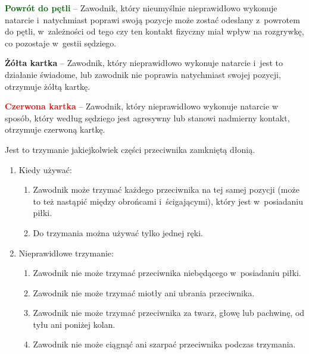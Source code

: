 \documentclass[12pt,a4paper]{article}
\renewcommand{\paragraph}[1]{
  \oldparagraph{#1}%
  \leftskip2.8cm
}
\newcommand\redcard[1]{\bgroup\textcolor{red}{\textbf{#1}}}
\newcommand\yellowcard[1]{\bgroup\textcolor{darkyellow}{\textbf{#1}}}
\newcommand\other[1]{\bgroup\textcolor{darkgreen}{\textbf{#1}}}
\begin{document}
\other{Powrót do pętli} -- Zawodnik, który nieumyślnie nieprawidłowo
wykonuje natarcie i~natychmiast poprawi swoją pozycje może zostać
odesłany z~powrotem do pętli, w~zależności od tego czy ten kontakt
fizyczny miał wpływ na rozgrywkę, co pozostaje w~gestii sędziego.

\yellowcard{Żółta kartka} -- Zawodnik, który nieprawidłowo wykonuje natarcie i~jest to działanie świadome, lub zawodnik nie poprawia natychmiast swojej
pozycji, otrzymuje żółtą kartkę.

\redcard{Czerwona kartka} -- Zawodnik, który nieprawidłowo wykonuje natarcie
w sposób, który według sędziego jest agresywny lub stanowi nadmierny
kontakt, otrzymuje czerwoną kartkę.

\paragraph{Trzymanie}
Jest to trzymanie jakiejkolwiek części
przeciwnika zamkniętą dłonią.

\begin{enumerate}
	\item
	      Kiedy używać:

	      \begin{enumerate}
		      \item Zawodnik może trzymać każdego przeciwnika na tej samej pozycji
		            (może to też nastąpić między obrońcami i~ścigającymi), który jest w~posiadaniu piłki.
		      \item
		            Do trzymania można używać tylko jednej ręki.
	      \end{enumerate}
	\item
	      Nieprawidłowe trzymanie:

	      \begin{enumerate}
		      \item
		            Zawodnik nie może trzymać przeciwnika niebędącego w~posiadaniu
		            piłki.
		      \item
		            Zawodnik nie może trzymać miotły ani ubrania przeciwnika.
		      \item
		            Zawodnik nie może trzymać przeciwnika za twarz, głowę lub pachwinę,
		            od tyłu ani poniżej kolan.
		      \item Zawodnik nie może ciągnąć ani szarpać przeciwnika podczas
		            trzymania.
	      \end{enumerate}
\end{enumerate}
\end{document}
